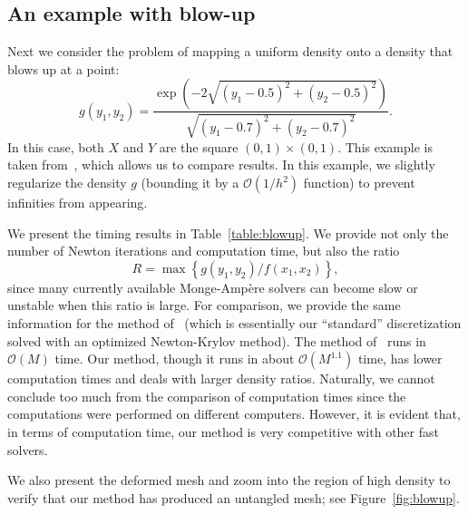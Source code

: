 \documentclass{amsart}
\theoremstyle{lemma}
\theoremstyle{remark}
\begin{document}
\subsection{An example with blow-up}\label{sec:exBlowup}
Next we consider the problem of mapping a uniform density onto a density that blows up at a point:
\[ g(y_1,y_2) =  \frac{\exp\left(-2\sqrt{(y_1-0.5)^2+(y_2-0.5)^2}\right)}{\sqrt{(y_1-0.7)^2+(y_2-0.7)^2}}.\]
In this case, both $X$ and $Y$ are the square $(0,1)\times(0,1)$.  This example is taken from~\cite{Delzanno}, which allows us to compare results.  In this example, we slightly regularize the density $g$ (bounding it by a ${\mathcal{O}}(1/h^2)$ function) to prevent infinities from appearing.

We present the timing results in Table~\ref{table:blowup}.  We provide not only the number of Newton iterations and computation time, but also the ratio
\[ R = \max\left\{g(y_1,y_2)/f(x_1,x_2)\right\}, \]
since many currently available {{Monge-Amp\`ere}\xspace} solvers can become slow or unstable when this ratio is large.
For comparison, we provide the same information for the method of~\cite{Delzanno} (which is essentially our ``standard'' discretization solved with an optimized Newton-Krylov method).  The method of~\cite{Delzanno} runs in ${\mathcal{O}}(M)$ time. Our method, though it runs in about ${\mathcal{O}}(M^{1.1})$ time, has lower computation times and deals with larger density ratios.  Naturally, we cannot conclude too much from the comparison of computation times since the computations were performed on different computers.  However, it is evident that, in terms of computation time, our method is very competitive with other fast solvers.

We also present the deformed mesh and zoom into the region of high density to verify that our method has produced an untangled mesh; see Figure~\ref{fig:blowup}.
\end{document}
